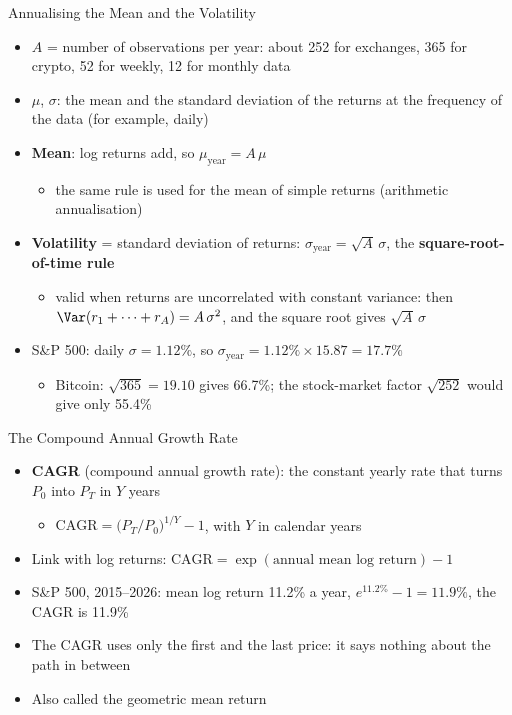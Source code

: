 \begin{frame}{Annualising the Mean and the Volatility}
\itemsize{\small}
\begin{itemize}
    \item $A$ = number of observations per year: about 252 for exchanges, 365 for crypto, 52 for weekly, 12 for monthly data
    \item $\mu$, $\sigma$: the mean and the standard deviation of the returns at the frequency of the data (for example, daily)
    \item \textbf{Mean}: log returns add, so $\mu_{\text{year}} = A\,\mu$
    \begin{itemize}
        \item the same rule is used for the mean of simple returns (arithmetic annualisation)
    \end{itemize}
    \item \textbf{Volatility} = standard deviation of returns: $\sigma_{\text{year}} = \sqrt{A}\,\sigma$, the \textbf{square-root-of-time rule}
    \begin{itemize}
        \item valid when returns are uncorrelated with constant variance: then $\Var(r_1 + \dots + r_A) = A\,\sigma^2$, and the square root gives $\sqrt{A}\,\sigma$
    \end{itemize}
    \item S\&P 500: daily $\sigma = 1.12\%$, so $\sigma_{\text{year}} = 1.12\% \times 15.87 = 17.7\%$
    \begin{itemize}
        \item Bitcoin: $\sqrt{365} = 19.10$ gives 66.7\%; the stock-market factor $\sqrt{252}$ would give only 55.4\%
    \end{itemize}
\end{itemize}
\end{frame}

\begin{frame}{The Compound Annual Growth Rate}
\itemsize{\small}
\begin{itemize}
    \item \textbf{CAGR} (compound annual growth rate): the constant yearly rate that turns $P_0$ into $P_T$ in $Y$ years
    \begin{itemize}
        \item $\text{CAGR} = \big(P_T / P_0\big)^{1/Y} - 1$, with $Y$ in calendar years
    \end{itemize}
    \item Link with log returns: $\text{CAGR} = \exp(\text{annual mean log return}) - 1$
    \item S\&P 500, 2015--2026: mean log return 11.2\% a year, $e^{11.2\%} - 1 = 11.9\%$, the CAGR is 11.9\%
    \item The CAGR uses only the first and the last price: it says nothing about the path in between
    \item Also called the geometric mean return
\end{itemize}
\end{frame}

